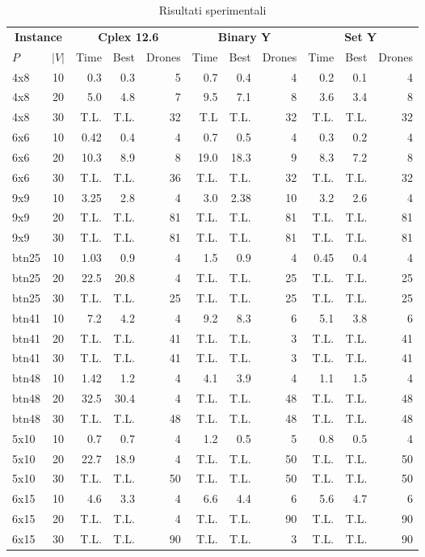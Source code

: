\begin{table} 
	\scriptsize
	\center
	\begin{tabular}{lc|rrr|rrr|rrr}
		\hline
		\multicolumn{2}{c}{\bf Instance} & \multicolumn{3}{|c}{{\bf Cplex 12.6}} & \multicolumn{3}{|c}{{\bf Binary Y}} & \multicolumn{3}{|c}{{\bf Set Y}}\\
		{\bf $P$} & $|V|$ & Time & Best & Drones & Time & Best & Drones & Time & Best & Drones \\
		\hline
		4x8 & 10 & 0.3 & 0.3 & 5 & 0.7 & 0.4 & 4 & 0.2 & 0.1 & 4 \\
		4x8 & 20 & 5.0 & 4.8 & 7 & 9.5 & 7.1 & 8 & 3.6 & 3.4 & 8 \\
		4x8 & 30 & T.L. & T.L. & 32 & T.L & T.L. & 32 & T.L. & T.L. & 32 \\
		6x6 & 10 & 0.42 & 0.4 & 4 & 0.7 & 0.5 & 4 & 0.3 & 0.2 & 4 \\
		6x6 & 20 & 10.3 & 8.9 & 8 & 19.0 & 18.3 & 9 & 8.3 & 7.2 & 8 \\
		6x6 & 30 & T.L. & T.L. & 36 & T.L. & T.L. & 32 & T.L. & T.L. & 32 \\
		9x9 & 10 & 3.25 & 2.8 & 4 & 3.0 & 2.38 & 10 & 3.2 & 2.6 & 4 \\
		9x9 & 20 & T.L. & T.L. & 81 & T.L. & T.L. & 81 & T.L. & T.L. & 81 \\
		9x9 & 30 & T.L. & T.L. & 81 & T.L. & T.L. & 81 & T.L. & T.L. & 81 \\
		btn25 & 10 & 1.03 & 0.9 & 4 & 1.5 & 0.9 & 4 & 0.45 & 0.4 & 4 \\
		btn25 & 20 & 22.5 & 20.8 & 4 & T.L. & T.L. & 25 & T.L. & T.L. & 25 \\
		btn25 & 30 & T.L. & T.L. & 25 & T.L. & T.L. & 25 & T.L. & T.L. & 25 \\
		btn41 & 10 & 7.2 & 4.2 & 4 & 9.2 & 8.3 & 6 & 5.1 & 3.8 & 6 \\
		btn41 & 20 & T.L. & T.L. & 41 & T.L. & T.L. & 3 & T.L. & T.L. & 41 \\
		btn41 & 30 & T.L. & T.L. & 41 & T.L. & T.L. & 3 & T.L. & T.L. & 41 \\
		btn48 & 10 & 1.42 & 1.2 & 4 & 4.1 & 3.9 & 4 & 1.1 & 1.5 & 4 \\
		btn48 & 20 & 32.5 & 30.4 & 4 & T.L. & T.L. & 48 & T.L. & T.L. & 48 \\
		btn48 & 30 & T.L. & T.L. & 48 & T.L. & T.L. & 48 & T.L. & T.L. & 48 \\
		5x10 & 10 & 0.7 & 0.7 & 4 & 1.2 & 0.5 & 5 & 0.8 & 0.5 & 4 \\
		5x10 & 20 & 22.7 & 18.9 & 4 & T.L. & T.L. & 50 & T.L. & T.L. & 50 \\
		5x10 & 30 & T.L. & T.L. & 50 & T.L. & T.L. & 50 & T.L. & T.L. & 50 \\
		6x15 & 10 & 4.6 & 3.3 & 4 & 6.6 & 4.4 & 6 & 5.6 & 4.7 & 6 \\
		6x15 & 20 & T.L. & T.L. & 4 & T.L. & T.L. & 90 & T.L. & T.L. & 90 \\
		6x15 & 30 & T.L. & T.L. & 90 & T.L. & T.L. & 3 & T.L. & T.L. & 90 \\
		\hline
	\end{tabular}
	\normalsize
	\caption{Risultati sperimentali} 
	\label{tabRes}
\end{table}
%